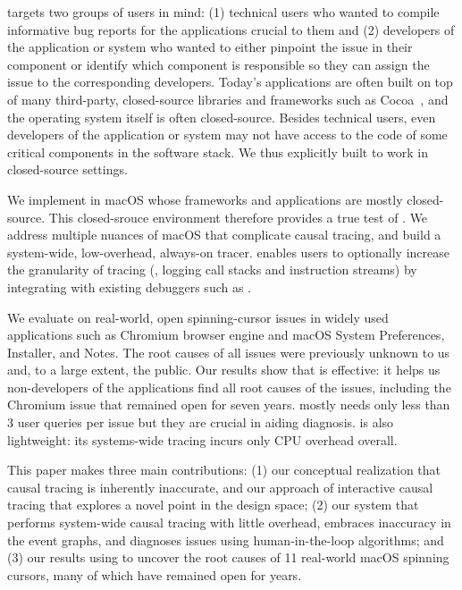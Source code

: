 \xxx targets two groups of users in mind: (1) technical users who wanted
to compile informative bug reports for the applications crucial to them
and (2) developers of the application or system who wanted to either
pinpoint the issue in their component or identify which component is
responsible so they can assign the issue to the corresponding developers.
Today's applications are often built on top of many third-party,
closed-source libraries and frameworks such as Cocoa~\cite{cocoa}, and the
operating system itself is often closed-source.  Besides technical users,
even developers of the application or system may not have access to the
code of some critical components in the software stack.  We thus
explicitly built \xxx to work in closed-source settings.

We implement \xxx in macOS whose frameworks and applications are mostly
closed-source. This closed-srouce environment therefore provides a true
test of \xxx. We address multiple nuances of macOS that complicate causal
tracing, and build a system-wide, low-overhead, always-on tracer. \xxx
enables users to optionally increase the granularity of tracing (\eg,
logging call stacks and instruction streams) by integrating with existing
debuggers such as .

We evaluate \xxx on \nbug real-world, open spinning-cursor issues in widely
used applications such as Chromium browser engine and macOS System Preferences,
Installer, and Notes. The root causes of all \nbug issues were previously
unknown to us and, to a large extent, the public. Our results show that \xxx is
effective: it helps us non-developers of the applications find all root causes
of the issues, including the Chromium issue that remained open for seven years.
\xxx mostly needs only less than 3 user queries per issue but they are crucial
in aiding diagnosis. \xxx is also lightweight: its systems-wide tracing incurs
only \cpuoverhead CPU overhead overall.


This paper makes three main contributions: (1) our conceptual realization
that causal tracing is inherently inaccurate, and our approach of
interactive causal tracing that explores a novel point in the design
space; (2) our system \xxx that performs system-wide causal tracing with
little overhead, embraces inaccuracy in the event graphs, and diagnoses
issues using human-in-the-loop algorithms; and (3) our results using \xxx
to uncover the root causes of 11 real-world macOS spinning cursors, many
of which have remained open for years.

